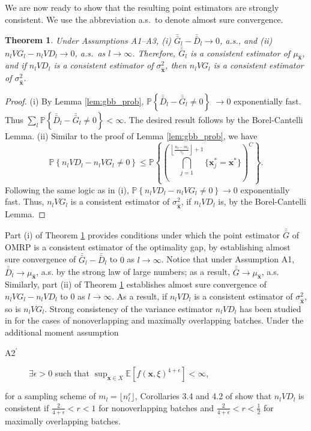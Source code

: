 \documentclass[12pt]{article}
\newtheorem{theorem}{Theorem}
\newcommand{\p}[1]{\mathbb{P} \left\{ #1 \right\}}
\newcommand{\e}[1]{\mathbb{E} \left[ #1 \right]
}
\newcommand{\x}{\mathbf{x}}
\newcommand{\xh}{{\hat{\x}}}
\newcommand{\xs}{\x^*}
\newcommand{\nbl}{\left\lfloor\tfrac{n_l-m_l}{\gamma_l}\right\rfloor+1}
\newcommand{\gb}{\bar{G}}
\newcommand{\gbb}{\bar{\gb}}
\newcommand{\db}{\bar{D}}
\newcommand{\dbb}{\bar{\db}}
\begin{document}
We are now ready to show that the resulting point estimators are strongly consistent. 
We use the abbreviation a.s.\ to denote almost sure convergence. 
 

\begin{theorem} \label{thm:strong_consistency}
	Under Assumptions A1--A3, (i) $\gbb_l - \dbb_l \rightarrow 0$, a.s., and (ii) $n_l VG_l - n_l VD_l \rightarrow 0$, a.s.\ as $l \rightarrow \infty$.  
        Therefore, $\gbb_l$ is a consistent estimator of $\mu_{\xh}$, and if $n_l VD_l$ is a consistent estimator of $\sigma^2_{\xh}$, then $n_l VG_l$ is a consistent estimator of $\sigma^2_{\xh}$.
\end{theorem}

\begin{proof}
	(i) By Lemma \ref{lem:gbb_prob}, $\p{\dbb_l - \gbb_l \neq 0}$ $\rightarrow 0$ exponentially fast.  
        Thus $\sum_l \p{\dbb_l - \gbb_l \neq 0} < \infty$.  
        The desired result follows by the Borel-Cantelli Lemma.
%
(ii) Similar to the proof of Lemma \ref{lem:gbb_prob}, we have
	\[
		\p{n_l VD_l -n_l VG_l \neq 0} \leq \p{\left( \bigcap_{j=1}^{\nbl} \{\xs_{j} = \xs\} \right)^C}.
	\]
	Following the same logic as in (i), $\p{n_l VD_l -n_l VG_l \neq 0} \rightarrow 0$ exponentially fast. 
Thus, $n_l VG_l$ is a consistent estimator of $\sigma^2_{\xh}$, if $n_l VD_l$ is, by the Borel-Cantelli Lemma.
\end{proof}

Part (i) of Theorem \ref{thm:strong_consistency} provides conditions under which the point estimator $\gbb$ of OMRP is a consistent estimator of the optimality gap, by establishing almost sure convergence of $\gbb_l - \dbb_l$ to $0$ as $l \rightarrow \infty$. 
Notice that under Assumption A1, $\dbb_l \rightarrow \mu_\xh$, a.s. by the strong law of large numbers; as a result, $\gbb \rightarrow \mu_\xh$, a.s. 
Similarly, part (ii) of Theorem \ref{thm:strong_consistency} establishes almost sure convergence of $n_l VG_l - n_l VD_l$ to $0$ as $l \rightarrow \infty$. 
As a result, if $n_l VD_l$ is a consistent estimator of $\sigma^2_{\xh}$, so is $n_l VG_l$.  
Strong consistency of the variance estimator $n_l VD_l$ has been studied in \cite{damerdji1994strong} for the cases of nonoverlapping and maximally overlapping batches.  
Under the additional moment assumption
\begin{description}
	\item[A2$^\prime$]  $\exists \epsilon > 0$ such that $\sup_{\x \in X} \e{f(\x,\xi)^{4+\epsilon}} < \infty$,
\end{description}
for a sampling scheme of $m_l = \lfloor n_l^r \rfloor$, Corollaries 3.4 and 4.2 of \cite{damerdji1994strong} show that $n_l VD_l$ is consistent if $\tfrac{2}{4+\epsilon} < r < 1$ for nonoverlapping batches and $\tfrac{2}{4+\epsilon} < r < \tfrac{1}{2}$ for maximally overlapping batches. 
\end{document}
